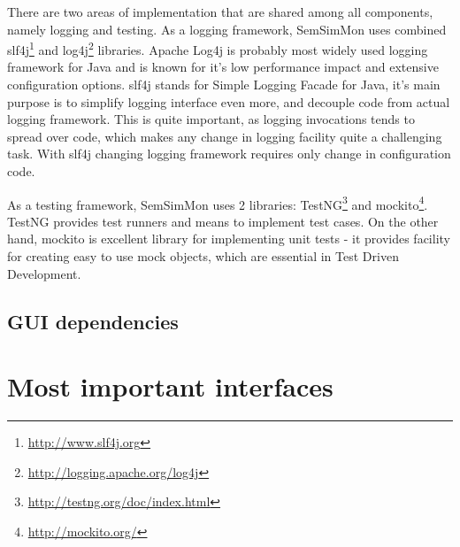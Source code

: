 There are two areas of implementation that are shared among all components, namely logging and testing. As a logging
framework, SemSimMon uses combined slf4j\footnote{\url{http://www.slf4j.org}} and
log4j\footnote{\url{http://logging.apache.org/log4j}} libraries. Apache Log4j is probably most widely used logging
framework for Java and is known for it's low performance impact and extensive configuration options. slf4j stands for
Simple Logging Facade for Java, it's main purpose is to simplify logging interface even more, and decouple code from
actual logging framework. This is quite important, as logging invocations tends to spread over code, which makes any
change in logging facility quite a challenging task. With slf4j changing logging framework requires only change in
configuration code.

As a testing framework, SemSimMon uses 2 libraries: TestNG\footnote{\url{http://testng.org/doc/index.html}} and
mockito\footnote{\url{http://mockito.org/}}. TestNG provides test runners and means to implement test cases. On the
other hand, mockito is excellent library for implementing unit tests - it provides facility for creating easy to use
mock objects, which are essential in Test Driven Development.

\subsection{GUI dependencies}




\section{Most important interfaces}



